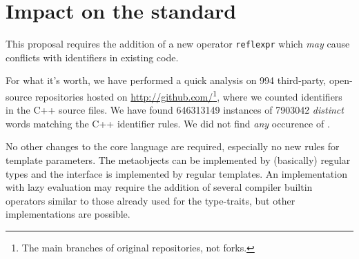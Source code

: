 \section{Impact on the standard}

This proposal requires the addition of a new operator
\texttt{reflexpr} which {\em may} cause conflicts with identifiers in existing code.

For what it's worth, we have performed a quick analysis on \num{994} third-party, open-source
repositories hosted on \url{http://github.com/}\footnote{The main branches
of original repositories, not forks.}, where we counted identifiers
in the C++ source files. We have found \num{646313149} instances of
\num{7903042} {\em distinct} words matching the C++ identifier rules.
We did not find {\em any} occurence of .

No other changes to the core language are required, especially no new rules
for template parameters. The metaobjects can be implemented by (basically) regular
types and the interface is implemented by regular templates.
An implementation with lazy evaluation may require the addition of several compiler builtin
operators similar to those already used for the type-traits, but other
implementations are possible.
